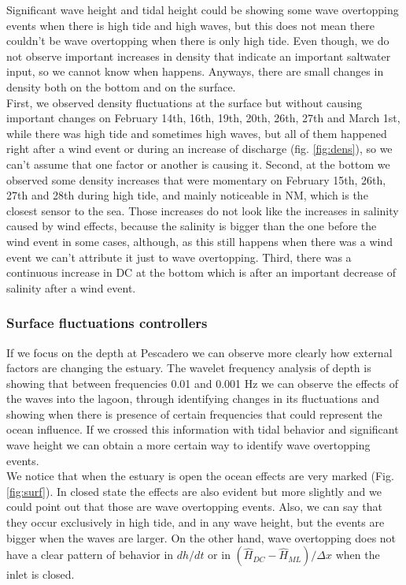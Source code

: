 \documentclass[tesis.tex]{subfiles}
\begin{document}
Significant wave height and tidal height could be showing some wave overtopping events when there is high tide and high waves, but this does not mean there couldn't be wave overtopping when there is only high tide. Even though, we do not observe important increases in density that indicate an important saltwater input, so we cannot know when happens. Anyways, there are small changes in density both on the bottom and on the surface.\\

First, we observed density fluctuations at the surface but without causing important changes on February 14th, 16th, 19th, 20th, 26th, 27th and March 1st, while there was high tide and sometimes high waves, but all of them happened right after a wind event or during an increase of discharge (fig. \ref{fig:dens}), so we can't assume that one factor or another is causing it. Second, at the bottom we observed some density increases that were momentary on February 15th, 26th, 27th and 28th during high tide, and mainly noticeable in NM, which is the closest sensor to the sea. Those increases do not look like the increases in salinity caused by wind effects, because the salinity is bigger than the one before the wind event in some cases, although, as this still happens when there was a wind event we can't attribute it just to wave overtopping. Third, there was a continuous increase in DC at the bottom which is after an important decrease of salinity after a wind event.\\

\subsubsection{Surface fluctuations controllers}

If we focus on the depth at Pescadero we can observe more clearly how external factors are changing the estuary. The wavelet frequency analysis of depth is showing that between frequencies 0.01 and 0.001 Hz we can observe the effects of the waves into the lagoon, through identifying changes in its fluctuations and showing when there is presence of certain frequencies that could represent the ocean influence. If we crossed this information with tidal behavior and significant wave height we can obtain a more certain way to identify wave overtopping events. \\

We notice that when the estuary is open the ocean effects are very marked (Fig. \ref{fig:surf}). In closed state the effects are also evident but more slightly and we could point out that those are wave overtopping events. Also, we can say that they occur exclusively in high tide, and in any wave height, but the events are bigger when the waves are larger. On the other hand, wave overtopping does not have a clear pattern of behavior in $dh/dt$ or in $(\hat{H}_{DC}-\hat{H}_{ML})/\Delta x$ when the inlet is closed.\\
\end{document}

